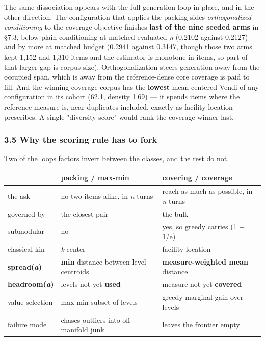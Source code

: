 \documentclass[
  10pt,
]{article}
\theoremstyle{plain}
\theoremstyle{definition}
\begin{document}
The same dissociation appears with the full generation loop in place,
and in the other direction. The configuration that applies the packing
side\textquotesingle s \emph{orthogonalized conditioning} to the
coverage objective finishes \textbf{last of the nine seeded arms} in
§7.3, below plain conditioning at matched evaluated \emph{n} (0.2102
against 0.2127) and by more at matched budget (0.2941 against 0.3147,
though those two arms kept 1,152 and 1,310 items and the estimator is
monotone in items, so part of that larger gap is corpus size).
Orthogonalization steers generation away from the occupied span, which
is away from the reference-dense core coverage is paid to fill. And the
winning coverage corpus has the \textbf{lowest} mean-centered Vendi of
any configuration in its cohort (62.1, density 1.69) --- it spends items
where the reference measure is, near-duplicates included, exactly as
facility location prescribes. A single "diversity score" would rank the
coverage winner last.

\subsubsection{3.5 Why the scoring rule has to
fork}\label{35-why-the-scoring-rule-has-to-fork}

Two of the loop\textquotesingle s factors invert between the classes,
and the rest do not.

{\footnotesize
\begin{longtable}[]{@{}>{\raggedright\arraybackslash}p{}>{\raggedright\arraybackslash}p{}>{\raggedright\arraybackslash}p{}@{}}
\toprule\noalign{}
& packing / max-min & covering / coverage \\
\midrule\noalign{}
\endhead
\bottomrule\noalign{}
\endlastfoot
the ask & no two items alike, in \emph{n} turns & reach as much as
possible, in \emph{n} turns \\
governed by & the closest pair & the bulk \\
submodular & no & yes, so greedy carries (1 − 1/e) \\
classical kin & \emph{k}-center & facility location \\
\textbf{spread(\emph{a})} & \textbf{min} distance between level
centroids & \textbf{measure-weighted mean} distance \\
\textbf{headroom(\emph{a})} & levels not yet \textbf{used} & measure not
yet \textbf{covered} \\
value selection & max-min subset of levels & greedy marginal gain over
levels \\
failure mode & chases outliers into off-manifold junk & leaves the
frontier empty \\
\end{longtable}}
\end{document}
